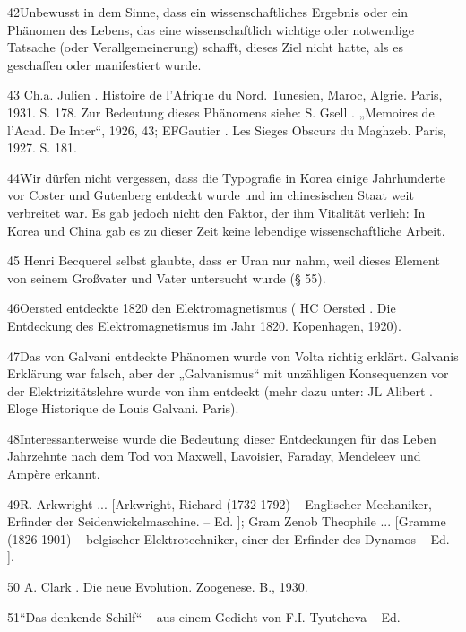 \documentclass[11pt,a4paper]{book}
\begin{document}
42Unbewusst in dem Sinne, dass ein wissenschaftliches Ergebnis oder ein Phänomen des Lebens, das eine wissenschaftlich wichtige oder notwendige Tatsache (oder Verallgemeinerung) schafft, dieses Ziel nicht hatte, als es geschaffen oder manifestiert wurde.



43 Ch.a. Julien . Histoire de l'Afrique du Nord. Tunesien, Maroc, Algrie. Paris, 1931. S. 178. Zur Bedeutung dieses Phänomens siehe: S. Gsell . „Memoires de l'Acad. De Inter“, 1926, 43; EFGautier . Les Sieges Obscurs du Maghzeb. Paris, 1927. S. 181.



44Wir dürfen nicht vergessen, dass die Typografie in Korea einige Jahrhunderte vor Coster und Gutenberg entdeckt wurde und im chinesischen Staat weit verbreitet war. Es gab jedoch nicht den Faktor, der ihm Vitalität verlieh: In Korea und China gab es zu dieser Zeit keine lebendige wissenschaftliche Arbeit.



45 Henri Becquerel selbst glaubte, dass er Uran nur nahm, weil dieses Element von seinem Großvater und Vater untersucht wurde (§ 55).



46Oersted entdeckte 1820 den Elektromagnetismus ( HC Oersted . Die Entdeckung des Elektromagnetismus im Jahr 1820. Kopenhagen, 1920).



47Das von Galvani entdeckte Phänomen wurde von Volta richtig erklärt. Galvanis Erklärung war falsch, aber der „Galvanismus“ mit unzähligen Konsequenzen vor der Elektrizitätslehre wurde von ihm entdeckt (mehr dazu unter: JL Alibert . Eloge Historique de Louis Galvani. Paris).



48Interessanterweise wurde die Bedeutung dieser Entdeckungen für das Leben Jahrzehnte nach dem Tod von Maxwell, Lavoisier, Faraday, Mendeleev und Ampère erkannt.



49R. Arkwright ... [Arkwright, Richard (1732-1792) -- Englischer Mechaniker, Erfinder der Seidenwickelmaschine. -- Ed. ]; Gram Zenob Theophile ... [Gramme (1826-1901) -- belgischer Elektrotechniker, einer der Erfinder des Dynamos -- Ed. ]. 



50 A. Clark . Die neue Evolution. Zoogenese. B., 1930.



51“Das denkende Schilf“ -- aus einem Gedicht von F.I. Tyutcheva -- Ed.
\end{document}
